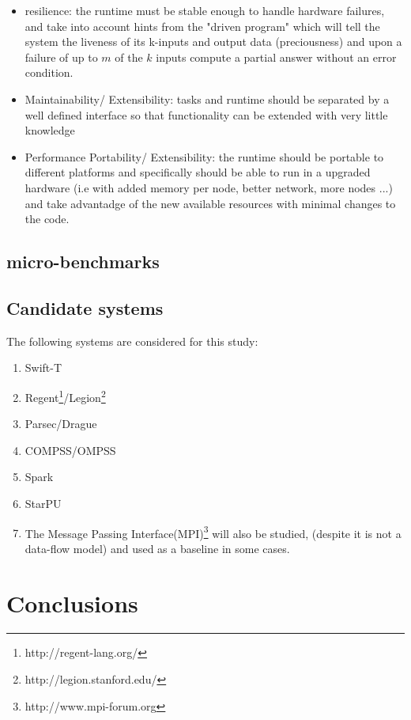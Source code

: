 \documentclass[11pt,a4paper]{article}
\begin{document}
\begin{itemize}
\item resilience: the runtime must be stable enough to handle hardware failures, and take into account hints from the "driven program" which will tell the system the liveness of its k-inputs and output data (preciousness) and upon a failure of up to $m$ of the $k$ inputs compute a partial answer without an error condition.
\item Maintainability/ Extensibility: tasks and runtime should be separated by a well defined interface so that functionality can be extended with very little knowledge 
\item Performance Portability/ Extensibility: the runtime should be portable to different platforms and specifically should be able to run in a upgraded hardware (i.e with added memory per node, better network, more nodes ...) and take advantadge of the new available resources with minimal changes to the code.
\end{itemize}

\subsection{micro-benchmarks}

\subsection{Candidate systems}
The following systems are considered for this study:
\begin{enumerate}
\item Swift-T 
\item Regent\footnote{http://regent-lang.org/}/Legion\footnote{http://legion.stanford.edu/}
\item Parsec/Drague
\item COMPSS/OMPSS
\item Spark
\item StarPU
\item The Message Passing Interface(MPI)\footnote{http://www.mpi-forum.org} will also be studied,
(despite it is not a data-flow model) and used as a baseline in some cases.
\end{enumerate}







\section{Conclusions}



%

\end{document}
